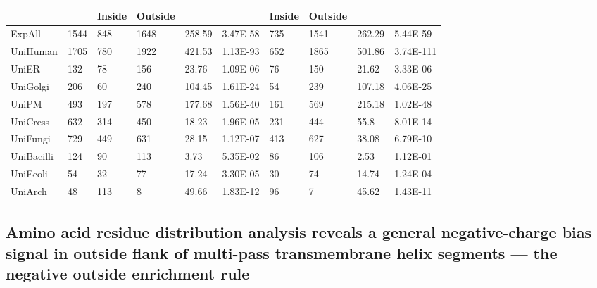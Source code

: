 \begin{table}[htbp!]
{\begin{tabular}{p{5em}lllllllll}
 \cmidrule{3-4}\cmidrule{7-8}    \multicolumn{1}{c}{} &       & \multicolumn{1}{p{5em}}{\textbf{Inside}} & \multicolumn{1}{p{5em}}{\textbf{Outside}} &       &       & \multicolumn{1}{p{5em}}{\textbf{Inside}} & \multicolumn{1}{p{5em}}{\textbf{Outside}} &       &  \\
     \midrule
     ExpAll & 1544  & 848   & 1648  & 258.59 & 3.47E-58 & 735   & 1541  & 262.29 & 5.44E-59 \\
     \midrule
     UniHuman & 1705  & 780   & 1922  & 421.53 & 1.13E-93 & 652   & 1865  & 501.86 & 3.74E-111 \\
     \midrule
     UniER & 132   & 78    & 156   & 23.76 & 1.09E-06 & 76    & 150   & 21.62 & 3.33E-06 \\
     \midrule
     UniGolgi & 206   & 60    & 240   & 104.45 & 1.61E-24 & 54    & 239   & 107.18 & 4.06E-25 \\
     \midrule
     UniPM & 493   & 197   & 578   & 177.68 & 1.56E-40 & 161   & 569   & 215.18 & 1.02E-48 \\
     \midrule
     UniCress & 632   & 314   & 450   & 18.23 & 1.96E-05 & 231   & 444   & 55.8  & 8.01E-14 \\
     \midrule
     UniFungi & 729   & 449   & 631   & 28.15 & 1.12E-07 & 413   & 627   & 38.08 & 6.79E-10 \\
     \midrule
     UniBacilli & 124   & 90    & 113   & 3.73  & 5.35E-02 & 86    & 106   & 2.53  & 1.12E-01 \\
     \midrule
     UniEcoli & 54    & 32    & 77    & 17.24 & 3.30E-05 & 30    & 74    & 14.74 & 1.24E-04 \\
     \midrule
     UniArch & 48    & 113   & 8     & 49.66 & 1.83E-12 & 96    & 7     & 45.62 & 1.43E-11 \\
     \bottomrule
     \end{tabular}}%
     \label{table:negativeskewsinglepass}

    \end{table}%

\subsection{Amino acid residue distribution analysis reveals a general negative\--charge bias signal in outside flank of multi\--pass transmembrane helix segments --- the negative outside enrichment rule}\label{section:negativeskewmultipass}

